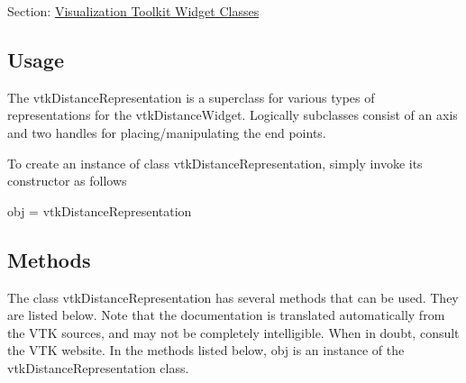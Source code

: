 Section\-: \hyperlink{sec_vtkwidgets}{Visualization Toolkit Widget Classes} \hypertarget{vtkwidgets_vtkxyplotwidget_Usage}{}\subsection{Usage}\label{vtkwidgets_vtkxyplotwidget_Usage}
The vtk\-Distance\-Representation is a superclass for various types of representations for the vtk\-Distance\-Widget. Logically subclasses consist of an axis and two handles for placing/manipulating the end points.

To create an instance of class vtk\-Distance\-Representation, simply invoke its constructor as follows \begin{DoxyVerb}  obj = vtkDistanceRepresentation
\end{DoxyVerb}
 \hypertarget{vtkwidgets_vtkxyplotwidget_Methods}{}\subsection{Methods}\label{vtkwidgets_vtkxyplotwidget_Methods}
The class vtk\-Distance\-Representation has several methods that can be used. They are listed below. Note that the documentation is translated automatically from the V\-T\-K sources, and may not be completely intelligible. When in doubt, consult the V\-T\-K website. In the methods listed below, {\ttfamily obj} is an instance of the vtk\-Distance\-Representation class. 
